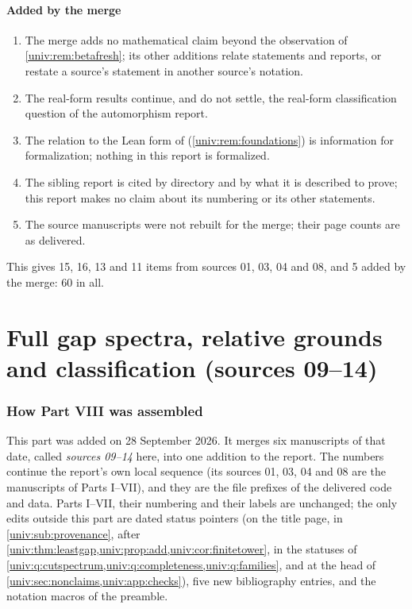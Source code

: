 \documentclass[11pt,letterpaper]{article}
\numberwithin{equation}{section}
\theoremstyle{definition}
\theoremstyle{remark}
\begin{document}
\subsection*{Added by the merge}
\begin{enumerate}[label=M.\arabic*,leftmargin=3.2em]
\item The merge adds no mathematical claim beyond the observation of
\cref{univ:rem:betafresh}; its other additions relate statements and reports,
or restate a source's statement in another source's notation.
\item The real-form results continue, and do not settle, the real-form
classification question of the automorphism report.
\item The relation to the Lean form of 
(\cref{univ:rem:foundations}) is information for formalization; nothing in this
report is formalized.
\item The sibling report is cited by directory and by what it is described to
prove; this report makes no claim about its numbering or its other statements.
\item The source manuscripts were not rebuilt for the merge; their page counts
are as delivered.
\end{enumerate}
This gives 15, 16, 13 and 11 items from sources 01, 03, 04 and 08, and 5 added
by the merge: 60 in all.

\part{Full gap spectra, relative grounds and classification (sources 09--14)}\label{univ:gs:part}

\section{How Part VIII was assembled}\label{univ:gs:sec:assembly}

This part was added on 28 September 2026. It merges six manuscripts of that
date, called \emph{sources 09--14} here, into one addition to the report. The
numbers continue the report's own local sequence (its sources 01, 03, 04 and 08
are the manuscripts of Parts I--VII), and they are the file prefixes of the
delivered code and data. Parts I--VII, their numbering and their labels are
unchanged; the only edits outside this part are dated status pointers (on the
title page, in \cref{univ:sub:provenance}, after
\cref{univ:thm:leastgap,univ:prop:add,univ:cor:finitetower}, in the statuses of
\cref{univ:q:cutspectrum,univ:q:completeness,univ:q:families}, and at the head
of \cref{univ:sec:nonclaims,univ:app:checks}), five new bibliography entries,
and the notation macros of the preamble.
\end{document}

